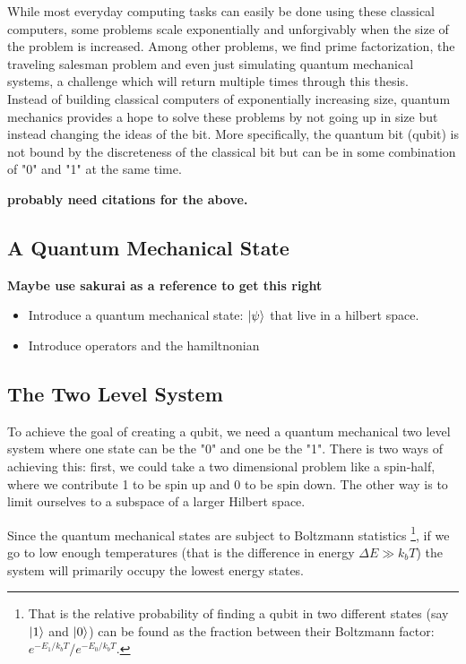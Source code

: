 While most everyday computing tasks can easily be done using these classical computers, some problems scale exponentially and unforgivably when the size of the problem is increased. Among other problems, we find prime factorization, the traveling salesman problem and even just simulating quantum mechanical systems, a challenge which will return multiple times through this thesis. \\

Instead of building classical computers of exponentially increasing size, quantum mechanics provides a hope to solve these problems by not going up in size but instead changing the ideas of the bit. More specifically, the quantum bit (qubit) is not bound by the discreteness of the classical bit but can be in some combination of "0" and "1" at the same time. 

\noindent
\textbf{probably need citations for the above.}

\subsection{A Quantum Mechanical State}
\textbf{Maybe use sakurai as a reference to get this right} \\ \noindent


\begin{itemize}
    \item Introduce a quantum mechanical state: $\ket{\psi}$ that live in a hilbert space.
    \item Introduce operators and the hamiltnonian
\end{itemize}

\subsection{The Two Level System}
To achieve the goal of creating a qubit, we need a quantum mechanical two level system where one state can be the "0" and one be the "1". There is two ways of achieving this: first, we could take a two dimensional problem like a spin-half, where we contribute 1 to be spin up and 0 to be spin down. The other way is to limit ourselves to a subspace of a larger Hilbert space.

Since the quantum mechanical states are subject to Boltzmann statistics \footnote{That is the relative probability of finding a qubit in two different states (say $\ket{1}$ and $\ket{0}$) can be found as the fraction between their Boltzmann factor: $e^{-E_1 / k_b  T} / e^{- E_0 / k_b  T}$.}, if we go to low enough temperatures (that is the difference in energy $\Delta E \gg k_b T$)  the system will primarily occupy the lowest energy states. 

